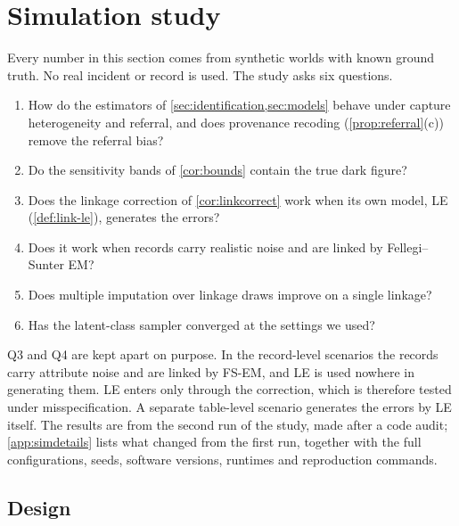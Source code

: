 \section{Simulation study}\label{sec:simulation}
\providecommand{\simfit}[1]{\resizebox{\ifdim\width>\linewidth\linewidth\else\width\fi}{!}{#1}}

Every number in this section comes from synthetic worlds with known ground truth. No real incident or record is used. The study asks six questions.
\begin{enumerate}[({Q}1)]
  \item How do the estimators of \cref{sec:identification,sec:models} behave under capture heterogeneity and referral, and does provenance recoding (\cref{prop:referral}(c)) remove the referral bias?
  \item Do the sensitivity bands of \cref{cor:bounds} contain the true dark figure?
  \item Does the linkage correction of \cref{cor:linkcorrect} work when its own model, LE (\cref{def:link-le}), generates the errors?
  \item Does it work when records carry realistic noise and are linked by Fellegi--Sunter EM?
  \item Does multiple imputation over linkage draws improve on a single linkage?
  \item Has the latent-class sampler converged at the settings we used?
\end{enumerate}
Q3 and Q4 are kept apart on purpose. In the record-level scenarios the records carry attribute noise and are linked by FS-EM, and LE is used nowhere in generating them. LE enters only through the correction, which is therefore tested under misspecification. A separate table-level scenario generates the errors by LE itself. The results are from the second run of the study, made after a code audit; \cref{app:simdetails} lists what changed from the first run, together with the full configurations, seeds, software versions, runtimes and reproduction commands.

\subsection{Design}\label{sec:sim-design}

